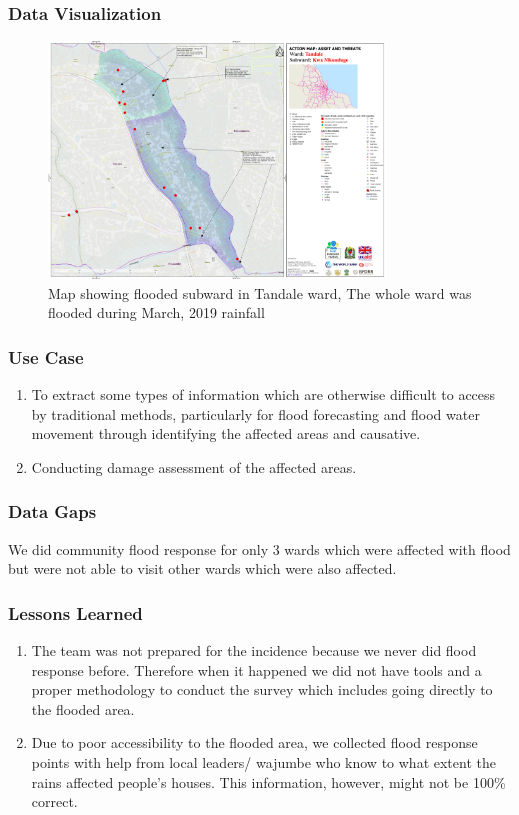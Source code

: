 \documentclass[a4paper,12pt,twoside]{article}
\begin{document}
\subsubsection{Data Visualization}
\begin{figure}[h]
  \color{RHgreen}\caption{Map showing flooded subward in Tandale ward, The whole ward was flooded during March, 2019 rainfall}
  \centering
    \includegraphics[width=0.8\textwidth]{images/Flood_Response_Data_Viz.png}
\end{figure}


\subsubsection{Use Case}
\begin{enumerate}
    \item To extract some types of information which are otherwise difficult to access by traditional methods, particularly for flood forecasting and flood water movement through identifying the affected areas and causative.
    \item Conducting damage assessment of the affected areas.
\end{enumerate}


\subsubsection{Data Gaps}
We did  community flood response for only 3 wards which were affected with flood but were not able to visit other wards which were also affected.

\subsubsection{Lessons Learned}
\begin{enumerate}
    \item The team was  not prepared for the incidence because we never did flood response before. Therefore when it happened we did not have tools and a proper methodology to conduct the survey which includes going  directly to the flooded area.
    \item Due to poor accessibility to the flooded area, we collected flood response points with help from local leaders/ wajumbe who know to  what extent the rains affected people’s houses. This information, however, might not be 100\% correct.
\end{enumerate}
\medskip
\end{document}
